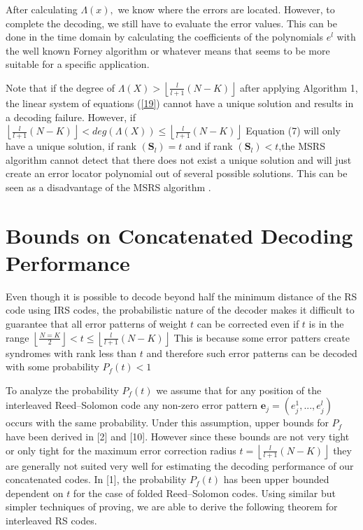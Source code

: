 \documentclass[fontsize=12pt]{article}
\begin{document}
After calculating $\Lambda(x), $ we know where the errors are
located. However, to complete the decoding, we still have
to evaluate the error values. This can be done in the time
domain by calculating the coefficients of the polynomials $e^{\mathit{l}}$
with the well known Forney algorithm or whatever means that 
seems to be more suitable for a specific application.

Note that if the degree of $\Lambda(X) > \left \lfloor \frac{l}{l+1} ({N - K}) \right \rfloor$ after applying
Algorithm 1, the linear system of equations (\ref{19}) cannot have
a unique solution and results in a decoding failure.
However, if $\left \lfloor \frac{l}{l+1} ({N - K}) \right \rfloor < deg(\Lambda(X)) \leq \left \lfloor \frac{l}{l+1} ({N - K}) \right \rfloor$
Equation (7) will only have a unique solution, if 
rank $(\mathbf{S}_l)=t$ and if rank $(\mathbf{S}_l)<t$,the MSRS algorithm cannot detect that there does not exist a unique solution and will just create
an error locator polynomial out of several possible solutions.
 This can be seen as a disadvantage of the MSRS algorithm .

\section{Bounds on Concatenated Decoding Performance}
Even though it is possible to decode beyond half the minimum distance of the RS code using IRS codes, the probabilistic nature of the decoder makes it difficult to guarantee that all error patterns of weight $t$ can be corrected even if $t$ is in the range $ \left \lfloor \frac{N=K}{2} \right \rfloor < t \leq  \left \lfloor \frac{l}{l+1} ({N - K}) \right \rfloor$ This is because some error patters create syndromes with rank less than $t$ and therefore such error patterns can be decoded with some probability $P_f(t) < 1$

To analyze the probability  $P_f(t)$ we
assume that for any position of the interleaved Reed–Solomon
code any non-zero error pattern $\mathbf{e}_j = (e_j^{1},...,e_j^{l})$ occurs with the same probability. Under this assumption, upper
bounds for $P_f$ have been derived in [2] and [10]. However
since these bounds are not very tight or only tight for the
maximum error correction radius  $t =  \left \lfloor \frac{l}{l+1} ({N - K}) \right \rfloor$ they are generally not suited very well for estimating the decoding
performance of our concatenated codes.
In [1], the probability $P_f(t)$ has been upper bounded dependent on $t$ for the case
of folded Reed–Solomon codes. Using similar but simpler techniques of proving, we are able to derive the following theorem for interleaved RS codes.
\end{document}
